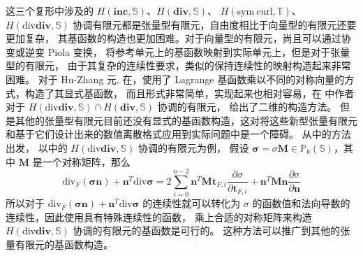 \documentclass[lang=cn,a4paper,newtx]{elegantpaper}
\begin{document}
这三个复形中涉及的 $H(\mathbf{inc}, \mathbb{S})$、$H(\mathbf{div}, \mathbb{S})$、
$H(\mathrm{sym\ curl}, \mathbb{T})$、$H(\mathrm{div}\mathbf{div}, \mathbb{S})$
协调有限元都是张量型有限元，自由度相比于向量型的有限元还要更加复杂，
其基函数的构造也更加困难。对于向量型的有限元，尚且可以通过协变或逆变
Piola 变换，
将参考单元上的基函数映射到实际单元上，但是对于张量型的有限元，
由于其复杂的连续性要求，类似的保持连续性的映射构造起来非常困难。 对于 Hu-Zhang 元,
在\cite{christiansen2018nodal}，使用了 Lagrange
基函数乘以不同的对称向量的方式，构造了其显式基函数，
而且形式非常简单，实现起来也相对容易，在 \cite{hu2021family} 中作者对于
$H(\mathrm{div}\mathbf{div}, \mathbb{S})\cap H(\mathbf{div}, \mathbb{S})$
协调的有限元， 给出了二维的构造方法。
但是其他的张量型有限元目前还没有显式的基函数构造，这对将这些新型张量有限元
和基于它们设计出来的数值离散格式应用到实际问题中是一个障碍。
从\cite{christiansen2018nodal, Chen2024GeometricDA}中的方法出发，
以\cite{Chenhuangdivdiv2020, chen2022finite}中的 
$H(\mathrm{div}\mathbf{div}, \mathbb{S})$ 协调的有限元为例，
假设 $\boldsymbol{\sigma} = \sigma \boldsymbol{M} \in
\mathbb{P}_k(\mathbb{S})$，其中 $\boldsymbol{M}$ 是一个对称矩阵，那么
$$
\mathrm{div}_F(\boldsymbol{\sigma n}) + \boldsymbol{n}^T 
\mathrm{div}\boldsymbol{\sigma} = 2\sum_{i=0}^{n-2}
\boldsymbol{n}^T \boldsymbol{M} \boldsymbol{t}_{F, i} \frac{\partial
\sigma}{\partial \boldsymbol{t}_{F, i}} + \boldsymbol{n}^T \boldsymbol{M}
\boldsymbol{n} \frac{\partial \sigma}{\partial \boldsymbol{n}}
$$
所以对于
$\mathrm{div}_F(\boldsymbol{\sigma n}) + \boldsymbol{n}^T 
\mathrm{div}\boldsymbol{\sigma}$ 的连续性就可以转化为 $\sigma$
的函数值和法向导数的连续性，因此使用具有特殊连续性的函数，
乘上合适的对称矩阵来构造 $H(\mathrm{div}\mathbf{div}, \mathbb{S})$ 
协调的有限元的基函数是可行的。
这种方法可以推广到其他的张量有限元的基函数构造。
\end{document}
